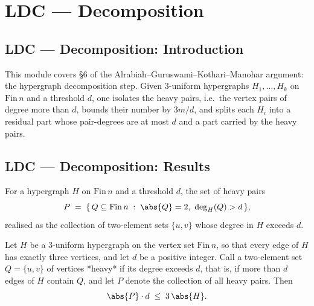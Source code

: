 \section{LDC --- Decomposition}
\subsection*{LDC --- Decomposition: Introduction}

This module covers \S6 of the Alrabiah--Guruswami--Kothari--Manohar argument: the
hypergraph decomposition step. Given $3$-uniform hypergraphs $H_1, \dots, H_k$ on
$\mathrm{Fin}\,n$ and a threshold $d$, one isolates the heavy pairs, i.e.\ the vertex
pairs of degree more than $d$, bounds their number by $3m/d$, and splits each $H_i$ into
a residual part whose pair-degrees are at most $d$ and a part carried by the heavy pairs.

\subsection*{LDC --- Decomposition: Results}

\begin{definition}
\label{heavyPairs}
\leanok
{}
For a hypergraph $H$ on $\mathrm{Fin}\,n$ and a threshold $d$, the set of heavy pairs
\[
  P \;=\; \{\, Q \subseteq \mathrm{Fin}\,n \;:\; \abs{Q} = 2, \ \deg_H(Q) > d \,\},
\]
realised as the collection of two-element sets $\{u,v\}$ whose degree in $H$ exceeds $d$.
\end{definition}

\begin{theorem}
\label{heavy_pair_count_bound}
\leanok
{}
Let $H$ be a $3$-uniform hypergraph on the vertex set $\mathrm{Fin}\,n$, so that every
edge of $H$ has exactly three vertices, and let $d$ be a positive integer. Call a
two-element set $Q = \{u,v\}$ of vertices *heavy* if its degree exceeds $d$, that is, if
more than $d$ edges of $H$ contain $Q$, and let $P$ denote the collection of all heavy
pairs. Then
\[
  \abs{P} \cdot d \;\le\; 3\,\abs{H}.
\]
\end{theorem}

